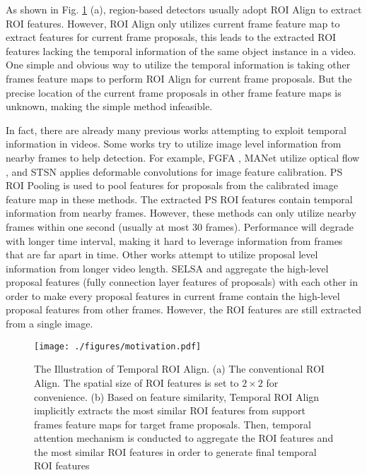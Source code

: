 \documentclass[letterpaper]{article} \usepackage{aaai21}  \usepackage{times}  \usepackage{helvet} \usepackage{courier}  \usepackage[hyphens]{url}  \usepackage{graphicx} \usepackage{hyperref}
\begin{document}
As shown in Fig. \ref{fig:motivation} (a), region-based detectors usually adopt ROI Align \cite{He_2017_ICCV} to extract ROI features. However, ROI Align only utilizes current frame feature map to extract features for current frame proposals, this leads to the extracted ROI features lacking the temporal information of the same object instance in a video. One simple and obvious way to utilize the temporal information is taking other frames feature maps to perform ROI Align for current frame proposals. But the precise location of the current frame proposals in other frame feature maps is unknown, making the simple method infeasible.

In fact, there are already many previous works \cite{zhu2017flow,wu2019sequence,xiao2018video,liu2018mobile,chen2018optimizing,deng2019object} attempting to exploit temporal information in videos. Some works try to utilize image level information from nearby frames to help detection. For example, FGFA \cite{zhu2017flow}, MANet \cite{wang2018fully} utilize optical flow \cite{dosovitskiy2015flownet}, and STSN \cite{bertasius2018object} applies deformable convolutions \cite{Dai_2017_ICCV} for image feature calibration. PS ROI Pooling \cite{dai2016r} is used to pool features for proposals from the calibrated image feature map in these methods. The extracted PS ROI features contain temporal information from nearby frames. However, these methods can only utilize  nearby frames within one second (usually at most 30 frames). Performance will degrade with longer time interval, making it hard to leverage information from frames that are far apart in time. Other works attempt to utilize proposal level information from longer video length. SELSA \cite{wu2019sequence} and \cite{shvets2019leveraging} aggregate the high-level proposal features (fully connection layer features of proposals) with each other in order to make every proposal features in current frame contain the high-level proposal features from other frames. However, the ROI features are still extracted from a single image.



\begin{figure}[t]
\centering
\texttt{[image: ./figures/motivation.pdf]}
\vspace{-0.25cm}
\caption{The Illustration of Temporal ROI Align. (a) The conventional ROI Align. The spatial size of ROI features is set to $2\times2$ for convenience. (b) Based on feature similarity, Temporal ROI Align implicitly extracts the most similar ROI features from support frames feature maps for target frame proposals. Then, temporal attention mechanism is conducted to aggregate the ROI features and the most similar ROI features in order to generate final temporal ROI features}
\label{fig:motivation}
\vspace{-0.35cm}
\end{figure}
\end{document}
